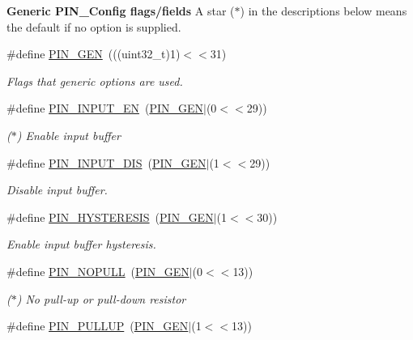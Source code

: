 \begin{Indent}{\bf Generic P\+I\+N\+\_\+\+Config flags/fields}
{A star ($\ast$) in the descriptions below means the default if no option is supplied. }\begin{DoxyCompactItemize}
\item 
\#define \hyperlink{_p_i_n_8h_ae1f7e47a17caab9697e69e5b9aff270b}{P\+I\+N\+\_\+\+G\+E\+N}~(((uint32\+\_\+t)1)$<$$<$31)
\begin{DoxyCompactList}\small\item\em Flags that generic options are used. \end{DoxyCompactList}\item 
\#define \hyperlink{_p_i_n_8h_a3cc36a3cdad818a5261bae5a2657a437}{P\+I\+N\+\_\+\+I\+N\+P\+U\+T\+\_\+\+E\+N}~(\hyperlink{_p_i_n_8h_ae1f7e47a17caab9697e69e5b9aff270b}{P\+I\+N\+\_\+\+G\+E\+N}$\vert$(0$<$$<$29))
\begin{DoxyCompactList}\small\item\em ($\ast$) Enable input buffer \end{DoxyCompactList}\item 
\#define \hyperlink{_p_i_n_8h_a1c8c8f99cf100a5d8745d879b18bd2b5}{P\+I\+N\+\_\+\+I\+N\+P\+U\+T\+\_\+\+D\+I\+S}~(\hyperlink{_p_i_n_8h_ae1f7e47a17caab9697e69e5b9aff270b}{P\+I\+N\+\_\+\+G\+E\+N}$\vert$(1$<$$<$29))
\begin{DoxyCompactList}\small\item\em Disable input buffer. \end{DoxyCompactList}\item 
\#define \hyperlink{_p_i_n_8h_a4113807b8b5acb98a84b26cc1730ad83}{P\+I\+N\+\_\+\+H\+Y\+S\+T\+E\+R\+E\+S\+I\+S}~(\hyperlink{_p_i_n_8h_ae1f7e47a17caab9697e69e5b9aff270b}{P\+I\+N\+\_\+\+G\+E\+N}$\vert$(1$<$$<$30))
\begin{DoxyCompactList}\small\item\em Enable input buffer hysteresis. \end{DoxyCompactList}\item 
\#define \hyperlink{_p_i_n_8h_a08ea493b755216db27b51a0402af862e}{P\+I\+N\+\_\+\+N\+O\+P\+U\+L\+L}~(\hyperlink{_p_i_n_8h_ae1f7e47a17caab9697e69e5b9aff270b}{P\+I\+N\+\_\+\+G\+E\+N}$\vert$(0$<$$<$13))
\begin{DoxyCompactList}\small\item\em ($\ast$) No pull-\/up or pull-\/down resistor \end{DoxyCompactList}\item 
\#define \hyperlink{_p_i_n_8h_a8dd57072ca956a8ace1ee869216dda0a}{P\+I\+N\+\_\+\+P\+U\+L\+L\+U\+P}~(\hyperlink{_p_i_n_8h_ae1f7e47a17caab9697e69e5b9aff270b}{P\+I\+N\+\_\+\+G\+E\+N}$\vert$(1$<$$<$13))

\end{DoxyCompactItemize}
\end{Indent}
